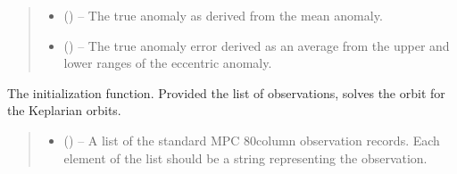 \documentclass[letterpaper,11pt,english]{sphinxmanual}
\begin{document}
\begin{savenotes}
\begin{fulllineitems}
\begin{savenotes}
\begin{fulllineitems}
\begin{quote}
\begin{description}
\sphinxAtStartPar
\begin{itemize}
\item {} 
\sphinxAtStartPar
{} () – The true anomaly as derived from the mean anomaly.

\item {} 
\sphinxAtStartPar
{} () – The true anomaly error derived as an average from the upper
and lower ranges of the eccentric anomaly.

\end{itemize}


\end{description}\end{quote}

\end{fulllineitems}\end{savenotes}


\begin{savenotes}\begin{fulllineitems}
\label{\detokenize{code/opihiexarata.orbit.solution:opihiexarata.orbit.solution.OrbitalSolution.__init__}}
\pysigstartsignatures
{}
\pysigstopsignatures
\sphinxAtStartPar
The initialization function. Provided the list of observations,
solves the orbit for the Keplarian orbits.
\begin{quote}\begin{description}
\begin{itemize}
\item {} 
\sphinxAtStartPar
{} () – A list of the standard MPC 80\sphinxhyphen{}column observation records. Each
element of the list should be a string representing the observation.


\end{itemize}
\end{description}
\end{quote}
\end{fulllineitems}
\end{savenotes}
\end{fulllineitems}
\end{savenotes}
\end{document}
